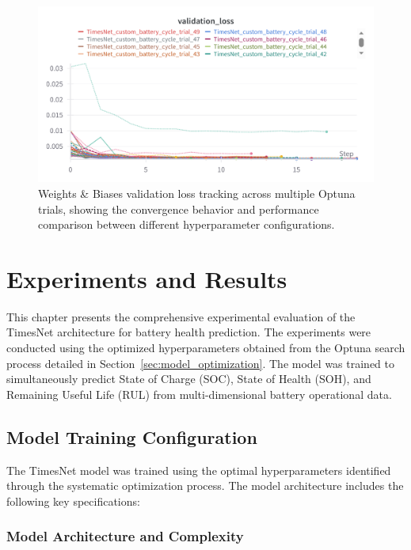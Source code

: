 \begin{figure}[htbp]
    \centering
    \includegraphics[width=1.0\textwidth]{imgs/W&B_optimization_validation_loss.png}
    \caption{Weights \& Biases validation loss tracking across multiple Optuna trials, showing the convergence behavior and performance comparison between different hyperparameter configurations.}
    \label{fig:wandb_validation_loss}
\end{figure}

\chapter{Experiments and Results}
\label{sec:experiments_results}

This chapter presents the comprehensive experimental evaluation of the TimesNet architecture for battery health prediction. The experiments were conducted using the optimized hyperparameters obtained from the Optuna search process detailed in Section~\ref{sec:model_optimization}. The model was trained to simultaneously predict State of Charge (SOC), State of Health (SOH), and Remaining Useful Life (RUL) from multi-dimensional battery operational data.

\section{Model Training Configuration}
\label{sec:training_config}

The TimesNet model was trained using the optimal hyperparameters identified through the systematic optimization process. The model architecture includes the following key specifications:

\subsection{Model Architecture and Complexity}
\label{subsec:model_complexity}

